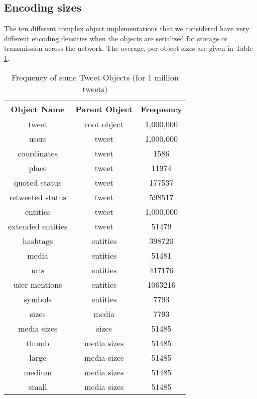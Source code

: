\subsection{Encoding sizes}
The ten different complex object implementations that we considered have very different encoding densities when the objects are serialized for storage or transmission across the network. The average, per-object sizes are given in Table \ref{tbl:object_size}. 
\begin{table}
	\centering
	\caption{Frequency of some Tweet Objects  (for 1 million tweets) }
	\label{tbl:object_size}
	\begin{adjustbox}{width=\columnwidth,center}	
		
		\begin{tabular}{|c|c|c|} \hline
			Object Name &Parent Object &Frequency\\ \hline
			tweet  & root object& 1,000,000 \\ \hline
			users & tweet & 1,000,000 \\ \hline
			coordinates  &tweet& 1586 \\ \hline
			place & tweet & 11974 \\ \hline
			quoted status  & tweet & 177537 \\ \hline
			retweeted status  & tweet & 598517 \\ \hline
			entities  & tweet & 1,000,000 \\ \hline
			extended entities  & tweet & 51479 \\ \hline
			hashtags  & entities & 398720 \\ \hline
			media  & entities & 51481 \\ \hline
			urls  & entities & 417176 \\ \hline
			user mentions  & entities & 1063216 \\ \hline
			symbols  & entities & 7793 \\ \hline
			sizes  & media & 7793 \\ \hline
			media sizes  & sizes & 51485 \\ \hline
			thumb  & media sizes & 51485 \\ \hline
			large  & media sizes & 51485 \\ \hline
			medium  & media sizes & 51485 \\ \hline
			small  & media sizes & 51485 \\ \hline
			\hline\end{tabular}
	\end{adjustbox}
\end{table}

